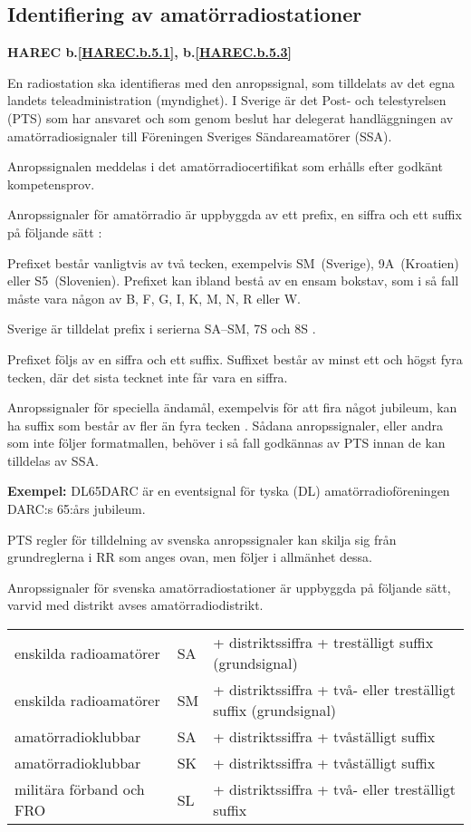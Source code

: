 \subsection{Identifiering av amatörradiostationer}
\textbf{
HAREC b.\ref{HAREC.b.5.1}\label{myHAREC.b.5.1},
 b.\ref{HAREC.b.5.3}\label{myHAREC.b.5.3}
}

En radiostation ska identifieras med den anropssignal, som tilldelats av det
egna landets teleadministration (myndighet).
I Sverige är det Post- och telestyrelsen (PTS) som har ansvaret och som genom
beslut har delegerat handläggningen av amatörradiosignaler till Föreningen
Sveriges Sändareamatörer (SSA).

Anropssignalen meddelas i det amatörradiocertifikat som erhålls efter godkänt
kompetensprov.

Anropssignaler för amatörradio är uppbyggda av ett prefix, en siffra och ett
suffix på följande sätt \cite[\S19.68, \S19.69]{ITU-RR}:

Prefixet består vanligtvis av två tecken, exempelvis SM~(Sverige), 9A~(Kroatien)
eller S5~(Slovenien).
Prefixet kan ibland bestå av en ensam bokstav, som i så fall måste vara någon
av B, F, G, I, K, M, N, R eller W.

Sverige är tilldelat prefix i serierna SA--SM, 7S och 8S
\cite[Appendix 42]{ITU-RR}.

Prefixet följs av en siffra och ett suffix. Suffixet består av minst ett och
högst fyra tecken, där det sista tecknet inte får vara en siffra.

Anropssignaler för speciella ändamål, exempelvis för att fira något jubileum,
kan ha suffix som består av fler än fyra tecken \cite[\S19.68A]{ITU-RR}.
Sådana anropssignaler, eller andra som inte följer formatmallen, behöver i så
fall godkännas av PTS innan de kan tilldelas av SSA.

\textbf{Exempel:} DL65DARC är en eventsignal för tyska (DL)
amatörradioföreningen DARC:s 65:års jubileum.

PTS regler för tilldelning av svenska anropssignaler kan skilja sig från grundreglerna
i RR som anges ovan, men följer i allmänhet dessa.

Anropssignaler för svenska amatörradiostationer är uppbyggda på följande
sätt, varvid med distrikt avses amatörradiodistrikt.

\begin{tabular}{lll}
enskilda radioamatörer & SA & + distriktssiffra + treställigt suffix (grundsignal) \\
enskilda radioamatörer & SM & + distriktssiffra + två- eller treställigt suffix (grundsignal) \\
amatörradioklubbar & SA & + distriktssiffra + tvåställigt suffix \\
amatörradioklubbar & SK & + distriktssiffra + tvåställigt suffix \\
militära förband och FRO & SL & + distriktssiffra + två- eller treställigt suffix \\
\end{tabular}

